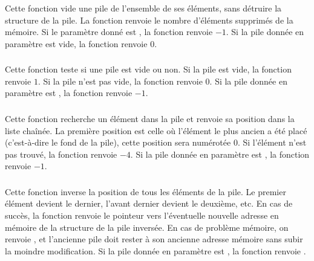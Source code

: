 \subsubsection*{}

\noindent Cette fonction vide une pile de l'ensemble de ses éléments, sans détruire la structure de la pile.
La fonction renvoie le nombre d'éléments supprimés de la mémoire.
Si le paramètre donné est , la fonction renvoie $ -1 $.
Si la pile donnée en paramètre est vide, la fonction renvoie $ 0 $.


\subsubsection*{}

\noindent Cette fonction teste si une pile est vide ou non.
Si la pile est vide, la fonction renvoie $ 1 $.
Si la pile n'est pas vide, la fonction renvoie $ 0 $.
Si la pile donnée en paramètre est , la fonction renvoie $ -1 $.


\subsubsection*{}

\noindent Cette fonction recherche un élément dans la pile et renvoie sa position dans la liste chaînée.
La première position est celle où l'élément le plus ancien a été placé (c'est-à-dire le fond de la pile), cette position sera numérotée $ 0 $.
Si l'élément n'est pas trouvé, la fonction renvoie $ -4 $.
Si la pile donnée en paramètre est , la fonction renvoie $ -1 $.


\subsubsection*{}

\noindent Cette fonction inverse la position de tous les éléments de la pile.
Le premier élément devient le dernier, l'avant dernier devient le deuxième, etc.
En cas de succès, la fonction renvoie le pointeur vers l'éventuelle nouvelle adresse en mémoire de la structure de la pile inversée.
En cas de problème mémoire, on renvoie , et l'ancienne pile doit rester à son ancienne adresse mémoire sans subir la moindre modification.
Si la pile donnée en paramètre est , la fonction renvoie .


